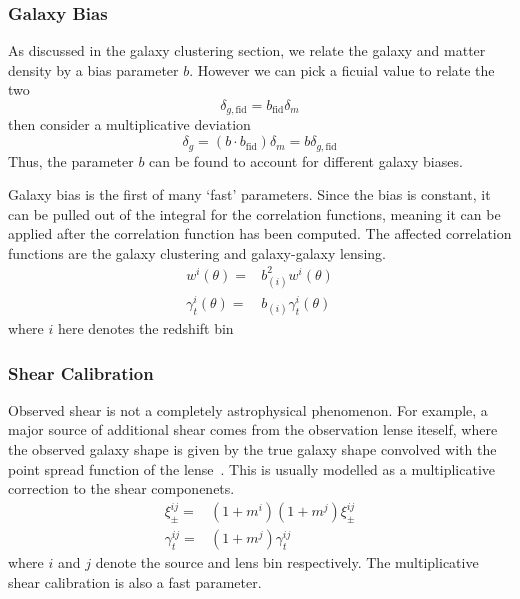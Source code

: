 \subsubsection{Galaxy Bias}
As discussed in the galaxy clustering section, we relate the galaxy and matter density by a bias parameter $b$. However we can pick a ficuial value to relate the two
\begin{equation}
	\delta_{g,\text{fid}} = b_{\text{fid}}\delta_m
\end{equation}
then consider a multiplicative deviation
\begin{equation}
	\delta_g = (b\cdot b_{\text{fid}})\delta_m = b\delta_{g,\text{fid}}
\end{equation}
Thus, the parameter $b$ can be found to account for different galaxy biases. 

Galaxy bias is the first of many `fast' parameters. Since the bias is constant, it can be pulled out of the integral for the correlation functions, meaning it can be applied after the correlation function has been computed. The affected correlation functions are the galaxy clustering and galaxy-galaxy lensing.
\begin{equation}
	\begin{split}
		w^i(\theta) =& b_{(i)}^2w^i(\theta) \\
		\gamma^i_t(\theta) =& b_{(i)}\gamma_t^i(\theta)
	\end{split}
\end{equation}
where $i$ here denotes the redshift bin
\subsubsection{Shear Calibration}
Observed shear is not a completely astrophysical phenomenon. For example, a major source of additional shear comes from the observation lense iteself, where the observed galaxy shape is given by the true galaxy shape convolved with the point spread function of the lense~\cite{hirata_shear_2003,gillis_effects_2019}. This is usually modelled as a multiplicative correction to the shear componenets.
\begin{equation}
	\begin{split}
		\xi^{ij}_{\pm} =& (1+m^i)(1+m^j) \xi^{ij}_{\pm} \\
		\gamma^{ij}_t =& (1+m^j) \gamma_t^{ij}
	\end{split}
\end{equation}
where $i$ and $j$ denote the source and lens bin respectively. The multiplicative shear calibration is also a fast parameter.
